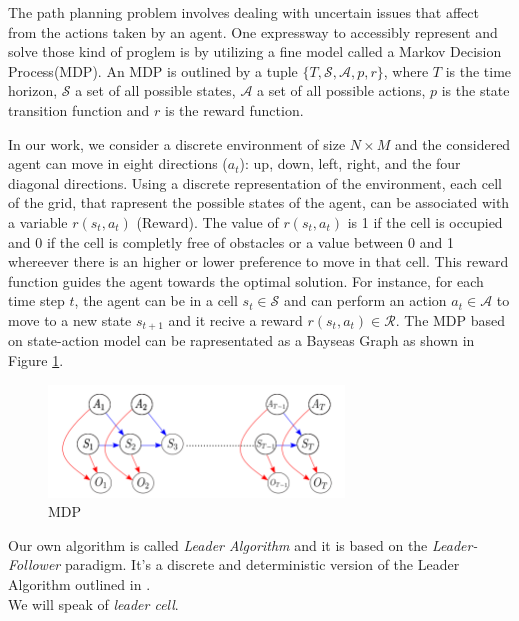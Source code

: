 \documentclass[journal,article,submit,pdftex,moreauthors]{Definitions/mdpi}
\begin{document}
The path planning problem involves dealing with uncertain issues that affect from the actions taken by an agent. One expressway to accessibly represent and solve those kind of proglem is by utilizing 
a fine model called a Markov Decision Process(MDP). 
An MDP is outlined by a tuple  $\{T, \mathcal{S}, \mathcal{A}, p, r\}$, where $T$ is the time horizon, $\mathcal{S}$ a set of all possible states,
 $\mathcal{A}$ a set of all possible actions, $p$ is the state transition function and $r$ is the reward function.

In our work, we consider a discrete environment of size $N\times M$ and the considered agent can move in eight directions ($a_t$): up, down, left, right, and the four diagonal directions.
Using a discrete representation of the environment, each cell of the grid, that rapresent the possible states of the agent, can be associated with a variable $r(s_t, a_t)$ (Reward).
 The value of $r(s_t, a_t)$ is 1 if the cell is occupied and 0 if the cell is completly free of obstacles or 
a value between 0 and 1 whereever there is an higher or lower preference to move in that cell. This reward function guides the agent towards the optimal solution. 
For instance, for each time step $t$, the agent can be in a cell $s_t\in \mathcal{S}$ and can perform an action $a_t \in \mathcal{A}$ to move to a new state $s_{t+1}$ and it recive a reward 
$r(s_t, a_t) \in \mathcal{R}$.
The MDP based on state-action model can be rapresentated as a Bayseas Graph as shown in Figure \ref{fig:MDP}.

\begin{figure}
	\centering
	\includegraphics[width=0.7\textwidth]{res/imgs/Mdp.png}
	\caption{MDP}
	\label{fig:MDP}
\end{figure}



Our own algorithm is called \textit{Leader Algorithm} and it is based on the \textit{Leader-Follower} paradigm. It's a discrete and deterministic version of the Leader Algorithm outlined 
in \cite{}.\\
 
We will speak  of \textit {leader cell}. 
\end{document}
